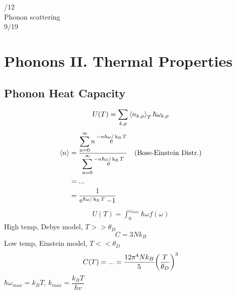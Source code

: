 \documentclass[UTF8]{ctexart} %
\DeclareMathOperator{\e}{\mathrm{e}}
\DeclareMathOperator{\kb}{k_{\mathrm{B}}}
\DeclareMathOperator{\sumnzinf}{\sum_{n=0}^\infty}
\newcommand{\dis}{\displaystyle}
\numberwithin{equation}{section}
\begin{document}
/12\\
Phonon scattering\\

9/19\\
\section{Phonons II. Thermal Properties}
\subsection{Phonon Heat Capacity}
\begin{equation}\label{key}
U(T) = \sum_{k,p} \expval{n_{k,p}}_T \hbar\omega_{k,p}
\end{equation}
\begin{equation}\label{key}
\begin{aligned}
\expval{n} &= \dfrac{\dis\sumnzinf n \e^{-n\hbar\omega/\kb T}}{\dis\sumnzinf \e^{-n\hbar\omega/\kb T}} \quad \text{(Bose-Einstein Distr.)}\\
&= ...\\
&= \dfrac{1}{\e^{\hbar\omega/\kb T} - 1}
\end{aligned}
\end{equation}
\begin{equation}\label{key}
\begin{aligned}
U(T) = \int_0^{\omega_{max}} \hbar\omega f(\omega)
\end{aligned}
\end{equation}
High temp, Debye model, $ T >> \theta_D $
\begin{equation}\label{key}
C = 3Nk_B
\end{equation}
Low temp, Einstein model, $ T << \theta_D $
\begin{equation}\label{key}
C(T) = ... = \dfrac{12\pi^4 Nk_B}{5}\qty(\dfrac{T}{\theta_D})^3
\end{equation}
$ \hbar\omega_{max} = k_B T $, $ k_{max} = \dfrac{k_B T}{\hbar v} $\\
\end{document}
